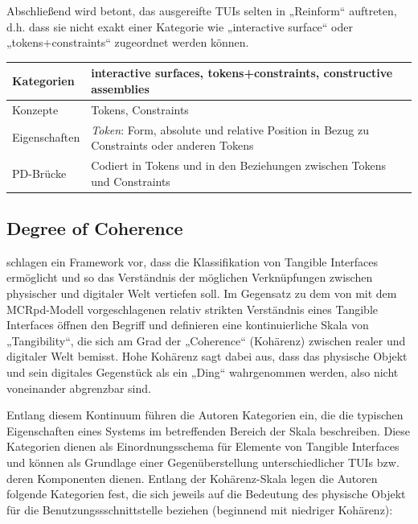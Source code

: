 Abschließend wird betont, das ausgereifte \glspl{TUI} selten in „Reinform“ auftreten, d.h. dass sie nicht exakt einer Kategorie wie „interactive surface“ oder „tokens+constraints“ zugeordnet werden können. 
\\[1em]
\begin{tabular}{| p{3cm} | p{10cm} |}
  \hline
  Kategorien & interactive surfaces, tokens+constraints, constructive assemblies \\ \hline
  Konzepte & Tokens, Constraints \\ \hline
  Eigenschaften & \emph{Token}: Form, absolute und relative Position in Bezug zu Constraints oder anderen Tokens \\ \hline
  PD-Brücke & Codiert in Tokens und in den Beziehungen zwischen Tokens und Constraints \\ \hline
\end{tabular} 


\subsection{Degree of Coherence} %
\label{sub:degree_of_coherence}
\citet{Koleva03} schlagen ein Framework vor, dass die Klassifikation von Tangible Interfaces ermöglicht und so das Verständnis der möglichen Verknüpfungen zwischen physischer und digitaler Welt vertiefen soll. Im Gegensatz zu dem von \citet{Ullmer00} mit dem MCRpd-Modell vorgeschlagenen relativ strikten Verständnis eines Tangible Interfaces öffnen \citeauthor{Koleva03} den Begriff und definieren eine kontinuierliche Skala von „Tangibility“, die sich am Grad der „Coherence“ (Kohärenz) zwischen realer und digitaler Welt bemisst. Hohe Kohärenz sagt dabei aus, dass das physische Objekt und sein digitales Gegenstück als ein „Ding“ wahrgenommen werden, also nicht voneinander abgrenzbar sind.

Entlang diesem Kontinuum führen die Autoren Kategorien ein, die die typischen Eigenschaften eines Systems im betreffenden Bereich der Skala beschreiben. Diese Kategorien dienen als Einordnungsschema für Elemente von Tangible Interfaces und können als Grundlage einer Gegenüberstellung unterschiedlicher \glspl{TUI} bzw. deren Komponenten dienen. Entlang der Kohärenz-Skala legen die Autoren folgende Kategorien fest, die sich jeweils auf die Bedeutung des physische Objekt für die Benutzungssschnittstelle beziehen (beginnend mit niedriger Kohärenz): 

